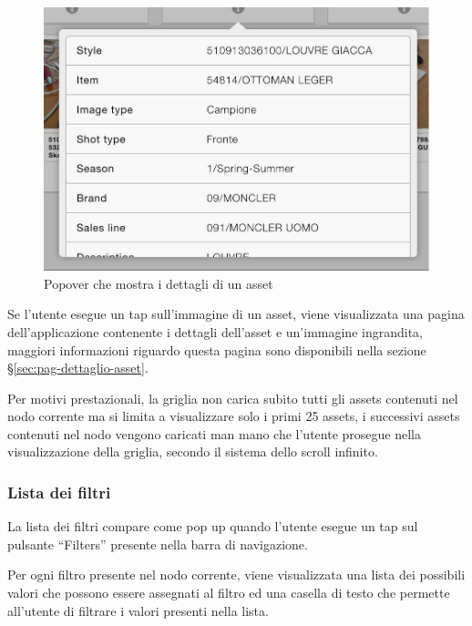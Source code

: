 \begin{figure}[htp]
\centering
\includegraphics[width=\textwidth*3/4]{../immagini/warda-gallery-dettaglio}
\caption{Popover che mostra i dettagli di un asset}  
\end{figure}

Se l'utente esegue un tap sull'immagine di un asset, viene visualizzata una pagina dell'applicazione contenente i dettagli dell'asset e un'immagine ingrandita, maggiori informazioni riguardo questa pagina sono disponibili nella sezione §\ref{sec:pag-dettaglio-asset}.


Per motivi prestazionali, la griglia non carica subito tutti gli assets contenuti nel nodo corrente ma si limita a visualizzare solo i primi 25 assets, i successivi assets contenuti nel nodo vengono caricati man mano che l'utente prosegue nella visualizzazione della griglia, secondo il sistema dello scroll infinito.

\subsubsection{Lista dei filtri}

La lista dei filtri compare come pop up quando l'utente esegue un tap sul pulsante ``Filters'' presente nella barra di navigazione.

Per ogni filtro presente nel nodo corrente, viene visualizzata una lista dei possibili valori che possono essere assegnati al filtro ed una casella di testo che permette all'utente di filtrare i valori presenti nella lista.

